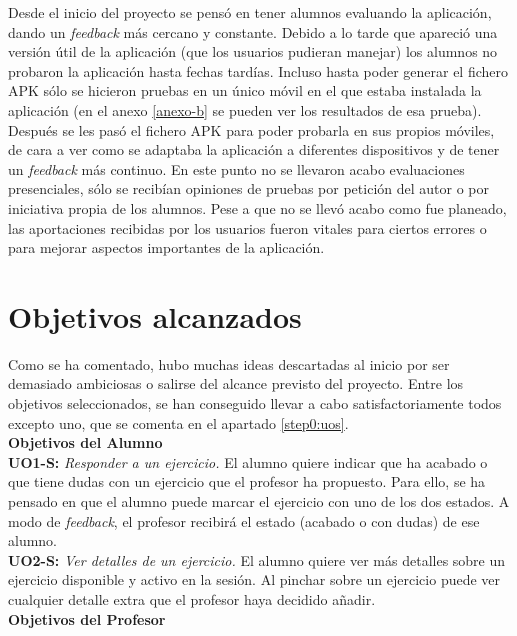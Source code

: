 Desde el inicio del proyecto se pensó en tener alumnos evaluando la aplicación, dando un \textit{feedback} más cercano y constante. Debido a lo tarde que apareció una versión útil de la aplicación (que los usuarios pudieran manejar) los alumnos no probaron la aplicación hasta fechas tardías. Incluso hasta poder generar el fichero APK sólo se hicieron pruebas en un único móvil en el que estaba instalada la aplicación (en el anexo \ref{anexo-b} se pueden ver los resultados de esa prueba). Después se les pasó el fichero APK para poder probarla en sus propios móviles, de cara a ver como se adaptaba la aplicación a diferentes dispositivos y de tener un \textit{feedback} más continuo. En este punto no se llevaron acabo evaluaciones presenciales, sólo se recibían opiniones de pruebas por petición del autor o por iniciativa propia de los alumnos. Pese a que no se llevó acabo como fue planeado, las aportaciones recibidas por los usuarios fueron vitales para ciertos errores o para mejorar aspectos importantes de la aplicación.\\

\section{Objetivos alcanzados}

Como se ha comentado, hubo muchas ideas descartadas al inicio por ser demasiado ambiciosas o salirse del alcance previsto del proyecto. Entre los objetivos seleccionados, se han conseguido llevar a cabo satisfactoriamente todos excepto uno, que se comenta en el apartado \ref{step0:uos}.\\

\textbf{Objetivos del Alumno}\\

\textbf{UO1-S:} \textit{Responder a un ejercicio.} El alumno quiere indicar que ha acabado o que tiene dudas con un ejercicio que el profesor ha propuesto. Para ello, se ha pensado en que el alumno puede marcar el ejercicio con uno de los dos estados. A modo de \textit{feedback}, el profesor recibirá el estado (acabado o con dudas) de ese alumno.\\

\textbf{UO2-S:} \textit{Ver detalles de un ejercicio.} El alumno quiere ver más detalles sobre un ejercicio disponible y activo en la sesión. Al pinchar sobre un ejercicio puede ver cualquier detalle extra que el profesor haya decidido añadir.\\

\textbf{Objetivos del Profesor}\\

